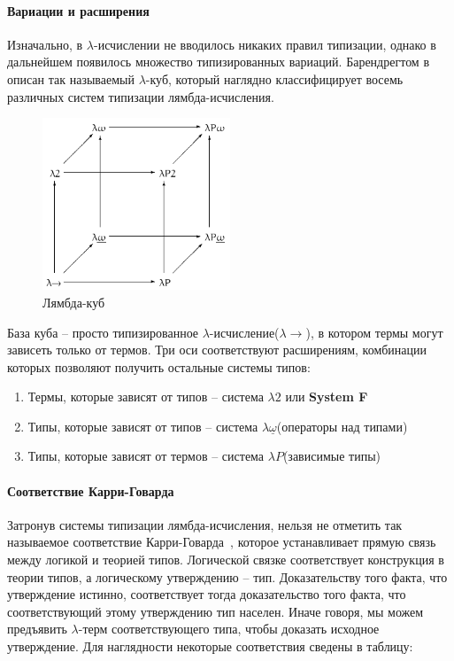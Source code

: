 \paragraph{Вариации и расширения}
Изначально, в $\lambda$-исчислении не вводилось никаких правил типизации, однако в дальнейшем появилось множество типизированных вариаций. Барендрегтом в~\cite{barendregt1993lambda} описан так называемый $\lambda$-куб, который наглядно классифицирует восемь различных систем типизации лямбда-исчисления.

\begin{figure}[H]
  \centering
  \includegraphics[width=0.5\textwidth]{img/Lambda_cube.png}
  \caption{Лямбда-куб}
\end{figure}

База куба -- просто типизированное $\lambda$-исчисление($\lambda{\to}$), в котором термы могут зависеть только от термов. Три оси соответствуют расширениям, комбинации которых позволяют получить остальные системы типов:

\begin{enumerate}
  \item Термы, которые зависят от типов -- система $\lambda2$ или \textbf{System F}
  \item Типы, которые зависят от типов -- система $\lambda \underline{\omega}$(операторы над типами)
  \item Типы, которые зависят от термов -- система $\lambda P$(зависимые типы)
\end{enumerate}

\paragraph{Соответствие Карри-Говарда}
Затронув системы типизации лямбда-исчисления, нельзя не отметить так называемое соответствие Карри-Говарда~\cite{howard1980formulae}, которое устанавливает прямую связь между логикой и теорией типов. Логической связке соответствует конструкция в теории типов, а логическому утверждению -- тип. Доказательству того факта, что утверждение истинно, соответствует тогда доказательство того факта, что соответствующий этому утверждению тип населен. Иначе говоря, мы можем предъявить $\lambda$-терм соответствующего типа, чтобы доказать исходное утверждение. Для наглядности некоторые соответствия сведены в таблицу:

